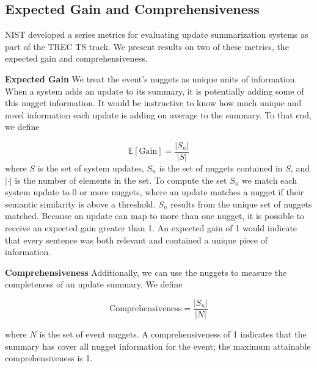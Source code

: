 \subsection{Expected Gain and Comprehensiveness}

NIST developed a series metrics for evaluating update summarization systems
as part of the TREC TS track.
We present results on two of these metrics, the expected gain and 
comprehensiveness.

\textbf{Expected Gain } We treat the event's nuggets as unique units of 
information.
When a system adds an update to its summary, it is potentially adding some
of this nugget information. It would be instructive to know how much unique
and novel information each update is adding on average to the summary.
To that end, we define

\[ \mathrm{\mathbb{E}[Gain]} = \frac{|S_n|}{|S|}%
\] 
where $S$ is the set of system updates, 
$S_n$ is the set of nuggets contained in $S$, and $|\cdot|$ is the number of
elements in the set.
To compute the set $S_n$ we match each system update to 0 or more nuggets, 
where an update matches a nugget if their semantic similarity is above 
a threshold. $S_n$ results from the unique set of nuggets matched.
Because an update can map to more than one nugget, it is possible to receive an
expected gain greater than 1.
An expected gain of 1 would indicate that every
sentence was both relevant and contained a unique piece of information.



\textbf{Comprehensiveness } Additionally, we can use the nuggets to measure the completeness of an update 
summary. We define

\[ \mathrm{Comprehensiveness} = \frac{|S_n|}{|N|}\]

where $N$ is the set of event nuggets.
A comprehensiveness of 1 indicates that the summary has cover 
all nugget information for the event; the maximum
attainable comprehensiveness is 1.

